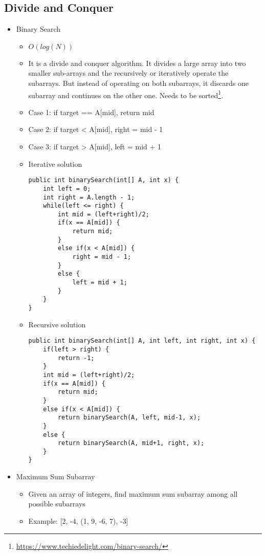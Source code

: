 \documentclass[a4paper, 11.25pt]{article}
\begin{document}
\subsection{Divide and Conquer}
\label{sec:divideAndConquer}
\begin{itemize}
    \item Binary Search
    \begin{itemize}
    \item $O(log(N))$
        \item It is a divide and conquer algorithm. It divides a large array into two smaller sub-arrays and the recursively or iteratively operate the subarrays. But instead of operating on both subarrays, it discards one subarray and continues on the other one. Needs to be sorted\footnote{\url{https://www.techiedelight.com/binary-search/}}.
        \item Case 1: if target == A[mid], return mid
        \item Case 2: if target < A[mid], right = mid - 1
        \item Case 3: if target > A[mid], left = mid + 1
        \item Iterative solution
        \begin{lstlisting}[style=CStyle]
public int binarySearch(int[] A, int x) {
    int left = 0;
    int right = A.length - 1;
    while(left <= right) {
        int mid = (left+right)/2;
        if(x == A[mid]) {
            return mid;
        }
        else if(x < A[mid]) {
            right = mid - 1;
        }
        else {
            left = mid + 1;
        }
    }
}\end{lstlisting}
        \item Recursive solution
        \begin{lstlisting}[style=CStyle]
public int binarySearch(int[] A, int left, int right, int x) {
    if(left > right) {
        return -1;
    }
    int mid = (left+right)/2;
    if(x == A[mid]) {
        return mid;
    }
    else if(x < A[mid]) {
        return binarySearch(A, left, mid-1, x);
    }
    else {
        return binarySearch(A, mid+1, right, x);
    }
}\end{lstlisting} 
    \end{itemize}
    \item Maximum Sum Subarray
    \begin{itemize}
        \item Given an array of integers, find maximum sum subarray among all possible subarrays
        \item Example: [2, -4, (1, 9, -6, 7), -3]

\end{itemize}
\end{itemize}
\end{document}
